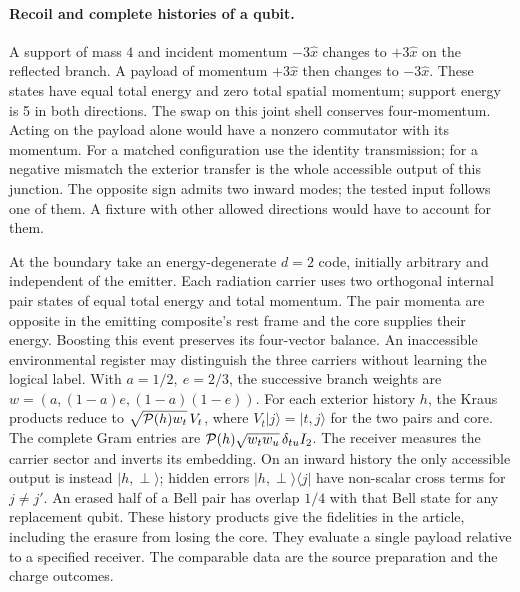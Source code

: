 \paragraph{Recoil and complete histories of a qubit.}
A support of mass \(4\) and incident momentum \(-3\hat x\) changes to \(+3\hat x\) on the reflected branch. A payload of momentum \(+3\hat x\) then changes to \(-3\hat x\). These states have equal total energy and zero total spatial momentum; support energy is 5 in both directions. The swap on this joint shell conserves four-momentum. Acting on the payload alone would have a nonzero commutator with its momentum. For a matched configuration use the identity transmission; for a negative mismatch the exterior transfer is the whole accessible output of this junction. The opposite sign admits two inward modes; the tested input follows one of them. A fixture with other allowed directions would have to account for them.

At the boundary take an energy-degenerate \(d=2\) code, initially arbitrary and independent of the emitter. Each radiation carrier uses two orthogonal internal pair states of equal total energy and total momentum. The pair momenta are opposite in the emitting composite's rest frame and the core supplies their energy. Boosting this event preserves its four-vector balance. An inaccessible environmental register may distinguish the three carriers without learning the logical label. With \(a=1/2,\ e=2/3\), the successive branch weights are \(w=(a,(1-a)e,(1-a)(1-e))\). For each exterior history \(h\), the Kraus products reduce to \(\sqrt{{\cal P}(h)w_t}\,V_t\), where \(V_t|j\rangle=|t,j\rangle\) for the two pairs and core. The complete Gram entries are \({\cal P}(h)\sqrt{w_tw_u}\,\delta_{tu} I_2\). The receiver measures the carrier sector and inverts its embedding. On an inward history the only accessible output is instead \(|h,\perp\rangle\); hidden errors \(|h,\perp\rangle\langle j|\) have non-scalar cross terms for \(j\ne j'\). An erased half of a Bell pair has overlap \(1/4\) with that Bell state for any replacement qubit. These history products give the fidelities in the article, including the erasure from losing the core. They evaluate a single payload relative to a specified receiver. The comparable data are the source preparation and the charge outcomes.

